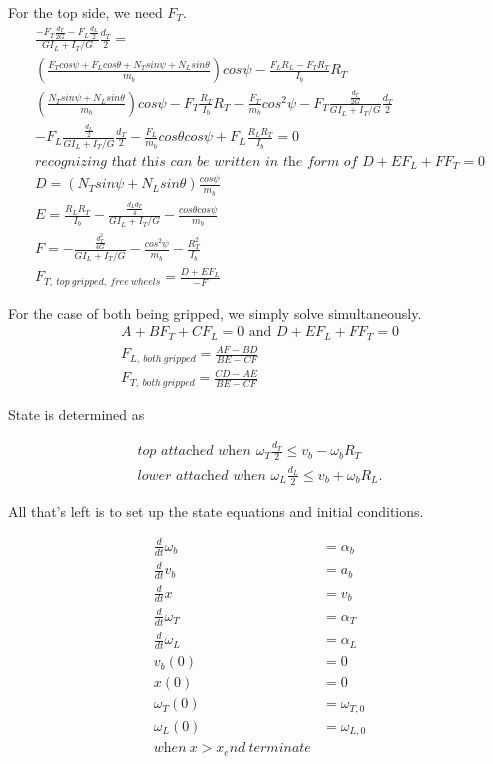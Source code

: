 \documentclass[10pt,letterpaper]{article}
\begin{document}
For the top side, we need $F_T$.
\begin{align}
	\frac{- F_T \frac{d_T}{2 G} - F_L \frac{d_L}{2}}{G I_L + I_T / G} \frac{d_T}{2} = \nonumber \\
	(\frac{F_T cos \psi + F_L cos \theta + N_T sin \psi + N_L sin \theta}{m_b}) cos \psi - \frac{F_L R_L - F_T R_T}{I_b} R_T \\
	(\frac{N_T sin \psi + N_L sin \theta}{m_b}) cos \psi - F_T \frac{R_T}{I_b} R_T - \frac{F_T}{m_b} cos^2 \psi - F_T \frac{\frac{d_T}{2 G}}{G I_L + I_T / G} \frac{d_T}{2} \nonumber \\
	- F_L \frac{\frac{d_L}{2}}{G I_L + I_T / G} \frac{d_T}{2} - \frac{F_L}{m_b} cos \theta cos \psi + F_L \frac{R_L R_T}{I_b} = 0 \\
	\textit{recognizing that this can be written in the form of } D + E F_L + F F_T = 0 \\
	D = (N_T sin \psi + N_L sin \theta) \frac{cos \psi}{m_b} \\
	E = \frac{R_L R_T}{I_b} - \frac{\frac{d_L d_T}{4}}{G I_L + I_T / G} - \frac{cos \theta cos \psi}{m_b} \\
	F = - \frac{\frac{d_T^2}{4 G}}{G I_L + I_T / G} - \frac{cos^2 \psi}{m_b} - \frac{R_T^2}{I_b} \\
	F_{T,\ top\ gripped,\ free\ wheels} = \frac{D + E F_L}{- F}
\end{align}

For the case of both being gripped, we simply solve simultaneously.
\begin{align}
	A + B F_T + C F_L = 0 \text{ and } D + E F_L + F F_T = 0 \nonumber \\
	F_{L,\ both\ gripped} = \frac{A F-B D}{B E-C F} \\
	F_{T,\ both\ gripped} = \frac{C D-A E}{B E-C F}
\end{align}

State is determined as

\begin{align}
	\textit{top attached when } \omega_{T} \frac{d_T}{2} \leq v_{b} - \omega_{b} R_T \\
	\textit{lower attached when } \omega_{L} \frac{d_L}{2} \leq v_{b} + \omega_{b} R_L .
\end{align}

	All that's left is to set up the state equations and initial conditions.

	\begin{align}
		\frac{d}{dt} \omega_b &= \alpha_b \\
		\frac{d}{dt} v_b &= a_b \\
		\frac{d}{dt} x &= v_b \\
		\frac{d}{dt} \omega_T &= \alpha_T \\
		\frac{d}{dt} \omega_L &= \alpha_L \\
		v_b(0) &= 0 \\
		x(0) &= 0 \\
		\omega_T(0) &= \omega_{T,0} \\
		\omega_L(0) &= \omega_{L,0} \\
		\textit{when} \ x > x_end \ \textit{terminate}
	\end{align}
\end{document}
